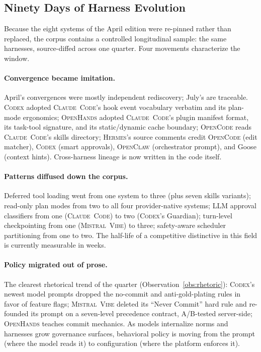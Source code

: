 \documentclass[11pt,a4paper]{article}
\newcommand{\clcode}{\textsc{Claude~Code}\xspace}
\newcommand{\cdx}{\textsc{Codex}\xspace}
\newcommand{\oh}{\textsc{OpenHands}\xspace}
\newcommand{\ocl}{\textsc{OpenClaw}\xspace}
\newcommand{\vibe}{\textsc{Mistral~Vibe}\xspace}
\newcommand{\hrm}{\textsc{Hermes}\xspace}
\newcommand{\ocd}{\textsc{OpenCode}\xspace}
\begin{document}
\subsection{Ninety Days of Harness Evolution}
\label{sec:evolution_window}

Because the eight systems of the April edition were re-pinned rather than replaced, the corpus contains a controlled longitudinal sample: the same harnesses, source-diffed across one quarter.
Four movements characterize the window.

\paragraph{Convergence became imitation.}
April's convergences were mostly independent rediscovery; July's are traceable.
\cdx{} adopted \clcode{}'s hook event vocabulary verbatim and its plan-mode ergonomics; \oh{} adopted \clcode{}'s plugin manifest format, its task-tool signature, and its static/dynamic cache boundary; \ocd{} reads \clcode{}'s skills directory; \hrm{}'s source comments credit \ocd{} (edit matcher), \cdx{} (smart approvals), \ocl{} (orchestrator prompt), and Goose (context hints).
Cross-harness lineage is now written in the code itself.

\paragraph{Patterns diffused down the corpus.}
Deferred tool loading went from one system to three (plus seven skills variants); read-only plan modes from two to all four provider-native systems; LLM approval classifiers from one (\clcode{}) to two (\cdx{}'s Guardian); turn-level checkpointing from one (\vibe{}) to three; safety-aware scheduler partitioning from one to two.
The half-life of a competitive distinctive in this field is currently measurable in weeks.

\paragraph{Policy migrated out of prose.}
The clearest rhetorical trend of the quarter (Observation~\ref{obs:rhetoric}): \cdx{}'s newest model prompts dropped the no-commit and anti-gold-plating rules in favor of feature flags; \vibe{} deleted its ``Never Commit'' hard rule and re-founded its prompt on a seven-level precedence contract, A/B-tested server-side; \oh{} teaches commit mechanics.
As models internalize norms and harnesses grow governance surfaces, behavioral policy is moving from the prompt (where the model reads it) to configuration (where the platform enforces it).
\end{document}
